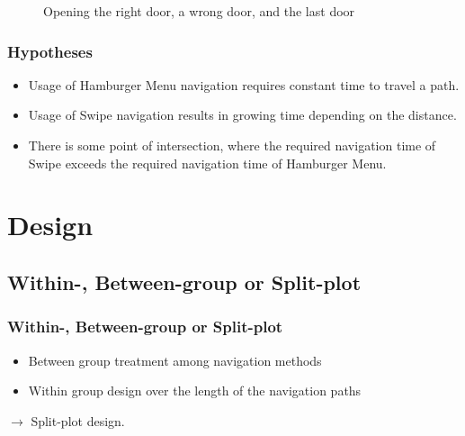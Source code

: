 \documentclass{beamer}
\begin{document}
\begin{frame}
\begin{figure}
		\caption{Opening the right door, a wrong door, and the last door}
		\end{figure}

\end{frame}

\begin{frame}
        \frametitle{Hypotheses}
        \begin{itemize}
                \item Usage of Hamburger Menu navigation requires constant time to travel a path.
                \item Usage of Swipe navigation
                        results in growing time depending on the distance.
                \item There is some point of intersection,
                        where the required navigation time of Swipe exceeds the required navigation time of Hamburger Menu.
        \end{itemize}

\end{frame}


\section{Design}
\subsection{Within-, Between-group or Split-plot}
\begin{frame}
        \frametitle{Within-, Between-group or Split-plot}
        \begin{itemize}
                \item Between group treatment among navigation methods
                \item Within group design over the length of the navigation paths
        \end{itemize}
        $\rightarrow$ Split-plot design.
\end{frame}
\end{document}

